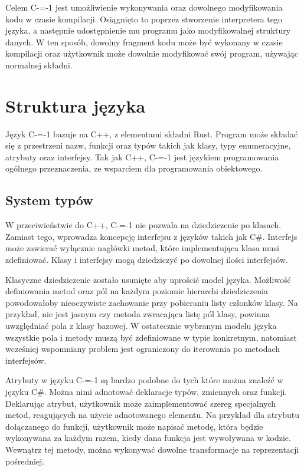 \documentclass[conference]{IEEEtran}
\begin{document}
Celem C-=-1 jest umożliwienie wykonywania oraz dowolnego modyfikowania kodu w czasie kompilacji.
Osiągnięto to poprzez stworzenie interpretera tego języka, a następnie udostępnienie mu programu jako modyfikowalnej struktury danych.
W ten sposób, dowolny fragment kodu może być wykonany w czasie kompilacji oraz użytkownik może dowolnie modyfikować swój program, używając normalnej składni.

\section{Struktura języka}

Język C-=-1 bazuje na C++, z elementami składni Rust.
Program może składać się z przestrzeni nazw, funkcji oraz typów takich jak klasy, typy enumeracyjne, atrybuty oraz interfejsy.
Tak jak C++, C-=-1 jest językiem programowania ogólnego przeznaczenia, ze wsparciem dla programowania obiektowego.

\subsection{System typów}

W przeciwieństwie do C++, C-=-1 nie pozwala na dziedziczenie po klasach.
Zamiast tego, wprowadza koncepcję interfejsu z języków takich jak C\#.
Interfejs może zawierać wyłącznie nagłówki metod, które implementująca klasa musi zdefiniować.
Klasy i interfejsy mogą dziedziczyć po dowolnej ilości interfejsów.

Klasyczne dziedziczenie zostało usunięte aby uprościć model języka.
Możliwość definiowania metod oraz pól na każdym poziomie hierarchi dziedziczenia powodowałoby nieoczywiste zachowanie przy pobieraniu listy członków klasy.
Na przykład, nie jest jasnym czy metoda zwracająca listę pól klasy, powinna uwzględniać pola z klasy bazowej.
W ostatecznie wybranym modelu języka wszystkie pola i metody muszą być zdefiniowane w typie konkretnym, natomiast wcześniej wspomniany problem jest ograniczony do iterowania po metodach interfejsów.

Atrybuty w języku C-=-1 są bardzo podobne do tych które  można znaleźć w języku C\#.
Można nimi adnotować deklaracje typów, zmiennych oraz funkcji.
Deklarując atrybut, użytkownik może zaimplementować szereg specjalnych metod, reagujących na użycie adnotowanego elementu.
Na przykład dla atrybutu dołączanego do funkcji, użytkownik może napisać metodę, która będzie wykonywana za każdym razem, kiedy dana funkcja jest wywoływana w kodzie.
Wewnątrz tej metody, można wykonywać dowolne transformacje na reprezentacji pośredniej.
\end{document}
